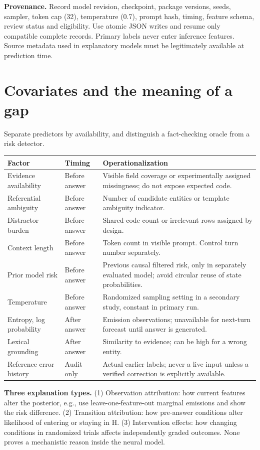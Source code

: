 \documentclass[11pt,letterpaper]{article}
\newcommand{\sectionpage}[1]{\clearpage\section{#1}}
\begin{document}
\textbf{Provenance.} Record model revision, checkpoint, package versions, seeds, sampler, token cap (32), temperature (0.7), prompt hash, timing, feature schema, review status and eligibility. Use atomic JSON writes and resume only compatible complete records. Primary labels never enter inference features. Source metadata used in explanatory models must be legitimately available at prediction time.

\sectionpage{Covariates and the meaning of a gap}
Separate predictors by availability, and distinguish a fact-checking oracle from a risk detector.

\begin{tabularx}{\linewidth}{p{.24\linewidth}p{.19\linewidth}X}
\toprule Factor & Timing & Operationalization \\ \midrule
Evidence availability & Before answer & Visible field coverage or experimentally assigned missingness; do not expose expected code. \\
Referential ambiguity & Before answer & Number of candidate entities or template ambiguity indicator. \\
Distractor burden & Before answer & Shared-code count or irrelevant rows assigned by design. \\
Context length & Before answer & Token count in visible prompt. Control turn number separately. \\
Prior model risk & Before answer & Previous causal filtered risk, only in separately evaluated model; avoid circular reuse of state probabilities. \\
Temperature & Before answer & Randomized sampling setting in a secondary study, constant in primary run. \\
Entropy, log probability & After answer & Emission observations; unavailable for next-turn forecast until answer is generated. \\
Lexical grounding & After answer & Similarity to evidence; can be high for a wrong entity. \\
Reference error history & Audit only & Actual earlier labels; never a live input unless a verified correction is explicitly available. \\ \bottomrule
\end{tabularx}

\textbf{Three explanation types.} (1) Observation attribution: how current features alter the posterior, e.g., use leave-one-feature-out marginal emissions and show the risk difference. (2) Transition attribution: how pre-answer conditions alter likelihood of entering or staying in H. (3) Intervention effects: how changing conditions in randomized trials affects independently graded outcomes. None proves a mechanistic reason inside the neural model.
\end{document}
